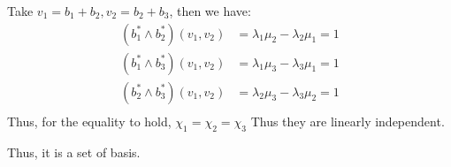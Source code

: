 \documentclass{article}
\begin{document}
\begin{itemize}
\begin{itemize}
\begin{itemize}
            Take \(v_1=b_1+b_2,v_2=b_2+b_3\), then we have: 
            \begin{align*}
                (b^*_1\wedge b^*_2)(v_1,v_2)&=\lambda_1\mu_2-\lambda_2\mu_1=1\\
                (b^*_1\wedge b^*_3)(v_1,v_2)&=\lambda_1\mu_3-\lambda_3\mu_1=1\\
                (b^*_2\wedge b^*_3)(v_1,v_2)&=\lambda_2\mu_3-\lambda_3\mu_2=1\\
            \end{align*}
            Thus, for the equality to hold, \(\chi_1=\chi_2=\chi_3\) Thus they are linearly independent.
        \end{itemize}
        Thus, it is a set of basis.
    \end{itemize}

\end{itemize}
\end{document}
